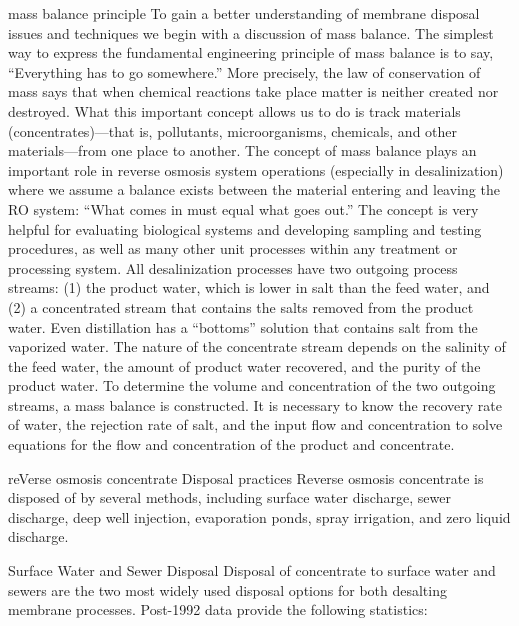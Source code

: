 \documentclass{article}
\begin{document}
mass balance principle To gain a better understanding of membrane
disposal issues and techniques we begin with a discussion of mass
balance. The simplest way to express the fundamental engineering
principle of mass balance is to say, ``Everything has to go somewhere.''
More precisely, the law of conservation of mass says that when chemical
reactions take place matter is neither created nor destroyed. What this
important concept allows us to do is track materials
(concentrates)---that is, pollutants, microorganisms, chemicals, and
other materials---from one place to another. The concept of mass balance
plays an important role in reverse osmosis system operations (especially
in desalinization) where we assume a balance exists between the material
entering and leaving the RO system: ``What comes in must equal what goes
out.'' The concept is very helpful for evaluating biological systems and
developing sampling and testing procedures, as well as many other unit
processes within any treatment or processing system. All desalinization
processes have two outgoing process streams: (1) the product water,
which is lower in salt than the feed water, and (2) a concentrated
stream that contains the salts removed from the product water. Even
distillation has a ``bottoms'' solution that contains salt from the
vaporized water. The nature of the concentrate stream depends on the
salinity of the feed water, the amount of product water recovered, and
the purity of the product water. To determine the volume and
concentration of the two outgoing streams, a mass balance is
constructed. It is necessary to know the recovery rate of water, the
rejection rate of salt, and the input flow and concentration to solve
equations for the flow and concentration of the product and concentrate.

reVerse osmosis concentrate Disposal practices Reverse osmosis
concentrate is disposed of by several methods, including surface water
discharge, sewer discharge, deep well injection, evaporation ponds,
spray irrigation, and zero liquid discharge.

Surface Water and Sewer Disposal Disposal of concentrate to surface
water and sewers are the two most widely used disposal options for both
desalting membrane processes. Post-1992 data provide the following
statistics:
\end{document}

